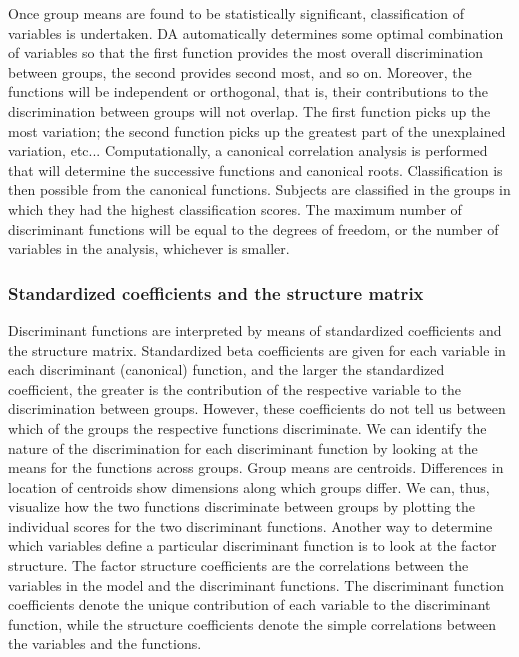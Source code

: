 
Once group means are found to be statistically significant, classification of
variables is undertaken. DA automatically determines some optimal combination
of variables so that the first function provides the most overall discrimination
between groups, the second provides second most, and so on. Moreover, the
functions will be independent or orthogonal, that is, their contributions to the
discrimination between groups will not overlap. The first function picks up the
most variation; the second function picks up the greatest part of the unexplained
variation, etc... Computationally, a canonical correlation analysis is performed
that will determine the successive functions and canonical roots. Classification is
then possible from the canonical functions. Subjects are classified in the groups
in which they had the highest classification scores. The maximum number of
discriminant functions will be equal to the degrees of freedom, or the number of
variables in the analysis, whichever is smaller.

\subsubsection{Standardized coefficients and the structure matrix}
Discriminant functions are interpreted by means of standardized coefficients and
the structure matrix. Standardized beta coefficients are given for each variable in
each discriminant (canonical) function, and the larger the standardized
coefficient, the greater is the contribution of the respective variable to the
discrimination between groups. However, these coefficients do not tell us
between which of the groups the respective functions discriminate. We can
identify the nature of the discrimination for each discriminant function by looking
at the means for the functions across groups. Group means are centroids.
Differences in location of centroids show dimensions along which groups differ.
We can, thus, visualize how the two functions discriminate between groups by
plotting the individual scores for the two discriminant functions.
Another way to determine which variables define a particular discriminant
function is to look at the factor structure. The factor structure coefficients are the
correlations between the variables in the model and the discriminant functions.
The discriminant function coefficients denote the unique contribution of each
variable to the discriminant function, while the structure coefficients denote the
simple correlations between the variables and the functions.
